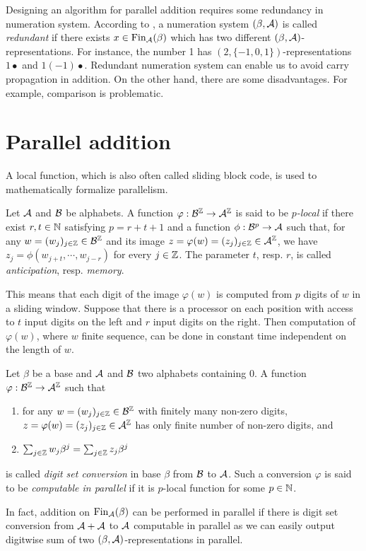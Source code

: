 Designing an algorithm for parallel addition requires some redundancy in numeration system. According to \cite{redundant}, a numeration system $(\beta,\mathcal{A})$ is called \emph{redundant} if there exists $x \in \text{Fin}_{\mathcal{A}}(\beta)$ which has two different $(\beta,\mathcal{A})$-representations. For instance, the number 1 has $(2,\{-1,0,1\})$-representations $1\bullet$ and $1(-1)\bullet$.
Redundant numeration system can enable us to avoid carry propagation in addition. On the other hand, there are some disadvantages. For example, comparison is problematic.  


\section{Parallel addition}
A local function, which is also often called sliding block code, is used to mathematically formalize parallelism. 
\begin{defn}
Let $\mathcal{A}$ and $\mathcal{B}$ be alphabets. A function $\varphi:\mathcal{B}^{\mathbb{Z}} \rightarrow \mathcal{A}^{\mathbb{Z}}$ is said to be \emph{$p$-local} if there exist $r,t\in\mathbb{N}$ satisfying $p=r+t+1$ and a function $\phi: \mathcal{B}^p \rightarrow \mathcal{A}$ such that, for any $w=(w_j)_{j\in\mathbb{Z}}\in\mathcal{B}^{\mathbb{Z}}$ and its image $z=\varphi(w)=(z_j)_{j\in\mathbb{Z}}\in\mathcal{A}^{\mathbb{Z}}$, we have $z_j=\phi(w_{j+t},\cdots,w_{j-r})$ for every $j\in\mathbb{Z}$. The parameter $t$, resp. $r$, is called \emph{anticipation}, resp. \emph{memory}.
\end{defn}
This means that each digit of the image $\varphi(w)$ is computed from $p$ digits of $w$ in a sliding window. Suppose that there is a processor on  each position with access to $t$ input digits on the left and $r$ input digits on the right. Then computation of $\varphi(w)$, where $w$ finite sequence, can be done in constant time independent on the length of $w$.   
  
\begin{defn}
\label{def:digitSetConversion}
Let $\beta$ be a base and $\mathcal{A}$ and $\mathcal{B}$ two alphabets containing 0. A function $\varphi:\mathcal{B}^{\mathbb{Z}}\rightarrow \mathcal{A}^{\mathbb{Z}}$ such that
  \begin{enumerate}
      \item for any $w=(w_j)_{j\in\mathbb{Z}}\in\mathcal{B}^{\mathbb{Z}}$ with finitely many non-zero digits, $z=\varphi(w)=(z_j)_{j\in\mathbb{Z}}\in\mathcal{A}^{\mathbb{Z}}$ has only finite number of non-zero digits, and
      \item $\sum_{j\in\mathbb{Z}} w_j \beta^j= \sum_{j\in\mathbb{Z}} z_j \beta^j$
  \end{enumerate}
  is called \emph{digit set conversion} in base $\beta$ from $\mathcal{B}$ to $\mathcal{A}$. Such a conversion $\varphi$ is said to be \emph{computable in parallel} if it is $p$-local function for some $p\in\mathbb{N}$. 
\end{defn}
In fact, addition on $\text{Fin}_{\mathcal{A}}(\beta)$ can be performed in parallel if there is digit set conversion from $\mathcal{A}+\mathcal{A}$ to $\mathcal{A}$ computable in  parallel as we can easily output digitwise sum of two $(\beta,\mathcal{A})$-representations in parallel.   


